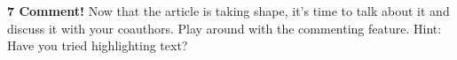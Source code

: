 \textbf{7 Comment!}
Now that the article is taking shape, it’s time to talk about it and discuss it with your coauthors. Play around with the commenting feature. Hint: Have you tried highlighting text?